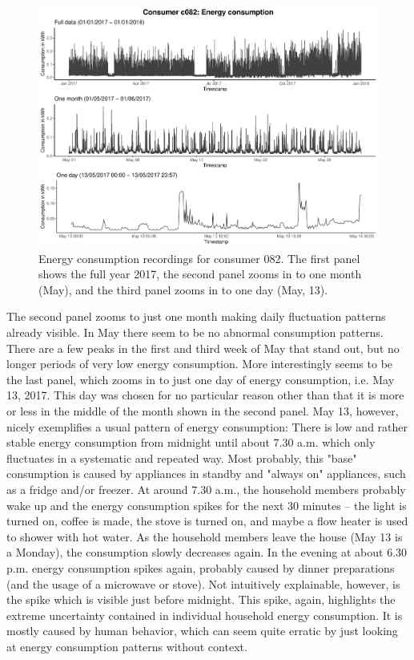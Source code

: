 \begin{figure}[htbp]
 \centering
\includegraphics[width=\textwidth]{thesis/graphs/timeseries/c082_cons.pdf}
\caption[Energy consumption recordings for consumer 082]{Energy consumption recordings for consumer 082. The first panel shows the full year 2017, the second panel zooms in to one month (May), and the third panel zooms in to one day (May, 13). \quantnet}
\label{Fig:energycons_c082}
\end{figure}

The second panel zooms to just one month making daily fluctuation patterns already visible. In May there seem to be no abnormal consumption patterns. There are a few peaks in the first and third week of May that stand out, but no longer periods of very low energy consumption. More interestingly seems to be the last panel, which zooms in to just one day of energy consumption, i.e. May 13, 2017. This day was chosen for no particular reason other than that it is more or less in the middle of the month shown in the second panel. May 13, however, nicely exemplifies a usual pattern of energy consumption: There is low and rather stable energy consumption from midnight until about 7.30 a.m. which only fluctuates in a systematic and repeated way. Most probably, this "base" consumption is caused by appliances in standby and "always on" appliances, such as a fridge and/or freezer. At around 7.30 a.m., the household members probably wake up and the energy consumption spikes for the next 30 minutes -- the light is turned on, coffee is made, the stove is turned on, and maybe a flow heater is used to shower with hot water. As the household members leave the house (May 13 is a Monday), the consumption slowly decreases again. In the evening at about 6.30 p.m. energy consumption spikes again, probably caused by dinner preparations (and the usage of a microwave or stove). Not intuitively explainable, however, is the spike which is visible just before midnight. This spike, again, highlights the extreme uncertainty contained in individual household energy consumption. It is mostly caused by human behavior, which can seem quite erratic by just looking at energy consumption patterns without context.

